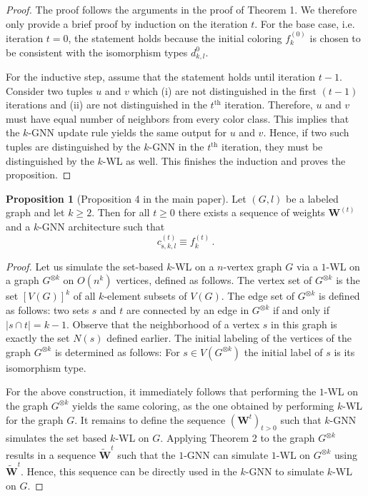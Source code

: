 \documentclass[letterpaper]{article}
\theoremstyle{definition}
\newtheorem{proposition}[theorem]{Proposition}
\begin{document}
\begin{proof}
	The proof follows the arguments in the proof of Theorem 1.
	We therefore only provide a brief proof by induction on the iteration $t$. 
	For the base case, i.e. iteration $t=0$, the statement holds because 
	the initial coloring $f_k^{(0)}$ is chosen to be consistent with the 
	isomorphism types $d^0_{k,l}$.
				
	For the inductive step, assume that the statement holds until iteration $t-1$.
	Consider two tuples $u$ and $v$ 
	which (i) are not distinguished in the first $(t-1)$ iterations 
	and (ii) are not distinguished in the $t^\text{th}$ iteration. 
	Therefore, $u$ and $v$ must have equal number of neighbors from 
	every color class. This implies that the $k$-GNN update rule yields the same output for $u$ and $v$.
	Hence, if two such tuples are distinguished by the $k$-GNN in the $t^\text{th}$ iteration,
	they must be distinguished by the $k$-WL as well. This finishes the induction and proves the proposition. 
\end{proof}

\begin{proposition}[Proposition 4 in the main paper]
	Let $(G, l)$ be a labeled graph and let $k\geq 2$. Then for all $t \geq 0$ there exists a sequence of weights $\mathbf{W}^{(t)}$ and a $k$-GNN architecture such that   
	\begin{equation*}
		c^{(t)}_{\text{s},k,l} \equiv f^{(t)}_{k}\,.
	\end{equation*}
\end{proposition}


\begin{proof}
	Let us simulate the set-based $k$-WL on a $n$-vertex graph $G$ 
	via a $1$-WL on a graph $G^{\otimes k}$ on $O(n^k)$ vertices,
	defined as follows. The vertex set of $G^{\otimes k}$ is the 
	set $[V(G)]^k$ of all $k$-element subsets of $V(G)$. 
	The edge set of $G^{\otimes k}$ is defined as follows: two 
	sets $s$ and $t$ are connected by an edge in $G^{\otimes k}$ 
	if and only if $|s \cap t| = k-1$. Observe that the 
	neighborhood of a vertex $s$ in this graph
	is exactly the set $N(s)$ defined earlier. 
	The initial labeling of the vertices of the graph $G^{\otimes k}$ is determined as follows:
	For $s\in V(G^{\otimes k})$ the initial label of $s$ is its isomorphism type.
				
	For the above construction, it immediately follows that 
	performing the $1$-WL on the graph $G^{\otimes k}$ yields the same 
	coloring, as the one obtained by performing $k$-WL for the graph $G$. It remains to define the sequence $(\boldsymbol{W}^{t})_{t>0}$ such that $k$-GNN simulates the set based $k$-WL on $G$. Applying Theorem 2 to the graph $G^{\otimes k}$ results in a 
	sequence $\widetilde{\boldsymbol{W}}^{t}$ such that the $1$-GNN can simulate $1$-WL on $G^{\otimes k}$ using $\widetilde{\boldsymbol{W}}^{t}$. 
	Hence, this sequence can be directly used in the $k$-GNN to simulate $k$-WL on $G$. 
\end{proof}
\end{document}
